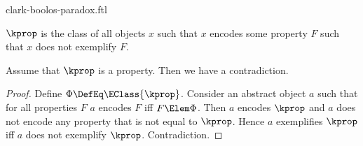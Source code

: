 \documentclass{stex}
\begin{document}
\begin{smodule}{clark-boolos-paradox.ftl}
\begin{forthel}
  \begin{definition*}
    $\kprop$ is the class of all objects $x$ such that $x$ encodes some property $F$ such that $x$ does not exemplify $F$.
  \end{definition*}

  \begin{theorem*}[title=Clark Boolos Paradox,name=Clark-Boolos Paradox]
    Assume that $\kprop$ is a property.
    Then we have a contradiction.
  \end{theorem*}
  \begin{proof}
    Define $\Phi \DefEq \EClass{\kprop}$.
    Consider an abstract object $a$ such that for all properties $F$ $a$ encodes $F$ iff $F \Elem \Phi$.
    Then $a$ encodes $\kprop$ and $a$ does not encode any property that is not equal to $\kprop$.
    Hence $a$ exemplifies $\kprop$ iff $a$ does not exemplify $\kprop$.
    Contradiction.
  \end{proof}
\end{forthel}

\printbibliography
{}
\end{smodule}
\end{document}
